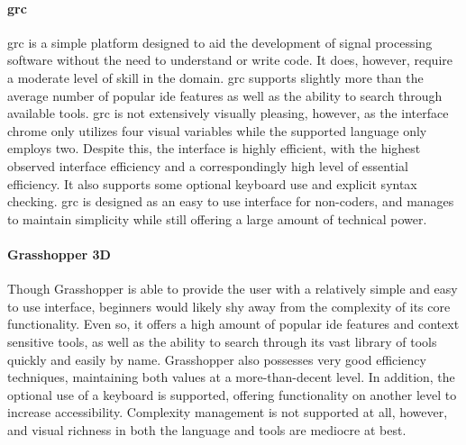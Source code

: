 \paragraph{\acl{grc}} \acl{grc} is a simple platform designed to aid the
development of signal processing software without the need to understand or
write code. It does, however, require a moderate level of skill in the
domain. \ac{grc} supports slightly more than the average number of popular
\ac{ide} features as well as the ability to search through available tools.
\ac{grc} is not extensively visually pleasing, however, as the interface
chrome only utilizes four visual variables while the supported language
only employs two. Despite this, the interface is highly efficient, with the
highest observed interface efficiency and a correspondingly high level of
essential efficiency. It also supports some optional keyboard use and
explicit syntax checking. \ac{grc} is designed as an easy to use interface
for non-coders, and manages to maintain simplicity while still offering a
large amount of technical power.

\paragraph{Grasshopper 3D} Though Grasshopper is able to provide the user
with a relatively simple and easy to use interface, beginners would likely
shy away from the complexity of its core functionality. Even so, it offers
a high amount of popular \ac{ide} features and context sensitive tools, as
well as the ability to search through its vast library of tools quickly and
easily by name. Grasshopper also possesses very good efficiency techniques,
maintaining both values at a more-than-decent level. In addition, the
optional use of a keyboard is supported, offering functionality on another
level to increase accessibility. Complexity management is not supported at
all, however, and visual richness in both the language and tools are
mediocre at best.

